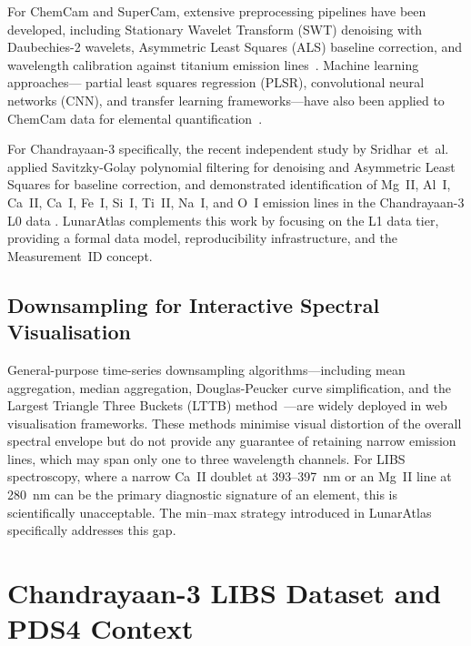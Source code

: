 \documentclass[a4paper,twocolumn,10pt]{article}
\begin{document}
For ChemCam and SuperCam, extensive preprocessing pipelines have been
developed, including Stationary Wavelet Transform (SWT) denoising with
Daubechies-2 wavelets, Asymmetric Least Squares (ALS) baseline
correction, and wavelength calibration against titanium emission
lines~\cite{Anderson2022,Clegg2017}.  Machine learning approaches---
partial least squares regression (PLSR), convolutional neural networks
(CNN), and transfer learning frameworks---have also been applied to
ChemCam data for elemental quantification~\cite{Clegg2017,
Castorena2021,Saeidfirozeh2024}.

For Chandrayaan-3 specifically, the recent independent study by
Sridhar~et~al. applied Savitzky-Golay polynomial filtering for
denoising and Asymmetric Least Squares for baseline correction, and
demonstrated identification of Mg~II, Al~I, Ca~II, Ca~I, Fe~I, Si~I,
Ti~II, Na~I, and O~I emission lines in the Chandrayaan-3 L0 data
\cite{Sridhar2025}.  LunarAtlas complements this work by focusing on
the L1 data tier, providing a formal data model, reproducibility
infrastructure, and the Measurement~ID concept.

\subsection{Downsampling for Interactive Spectral Visualisation}

General-purpose time-series downsampling algorithms---including mean
aggregation, median aggregation, Douglas-Peucker curve simplification,
and the Largest Triangle Three Buckets (LTTB) method~\cite{
Steinarsson2013}---are widely deployed in web visualisation frameworks.
These methods minimise visual distortion of the overall spectral
envelope but do not provide any guarantee of retaining narrow emission
lines, which may span only one to three wavelength channels.  For LIBS
spectroscopy, where a narrow Ca~II doublet at 393--397~nm or an Mg~II
line at 280~nm can be the primary diagnostic signature of an element,
this is scientifically unacceptable.  The min--max strategy introduced
in LunarAtlas specifically addresses this gap.


\section{Chandrayaan-3 LIBS Dataset and PDS4 Context}
\label{sec:data}
\end{document}
